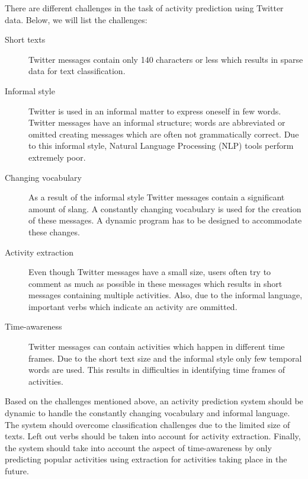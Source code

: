 There are different challenges in the task of activity prediction using Twitter data. Below, we will list the challenges:

\begin{description}
\item[Short texts] Twitter messages contain only 140 characters or less which results in sparse data for text classification.
\item[Informal style] Twitter is used in an informal matter to express oneself in few words. Twitter messages have an informal structure; words are abbreviated or omitted creating messages which are often not grammatically correct. Due to this informal style, Natural Language Processing (NLP) tools perform extremely poor.
\item[Changing vocabulary] As a result of the informal style Twitter messages contain a significant amount of slang. A constantly changing vocabulary is used for the creation of these messages. A dynamic program has to be designed to accommodate these changes.
\item[Activity extraction] Even though Twitter messages have a small size, users often try to comment as much as possible in these messages which results in short messages containing multiple activities. Also, due to the informal language, important verbs which indicate an activity are ommitted.
\item[Time-awareness] Twitter messages can contain activities which happen in different time frames. Due to the short text size and the informal style only few temporal words are used. This results in difficulties in identifying time frames of activities.
\end{description}

Based on the challenges mentioned above, an activity prediction system should be dynamic to handle the constantly changing vocabulary and informal language. The system should overcome classification challenges due to the limited size of texts. Left out verbs should be taken into account for activity extraction. Finally, the system should take into account the aspect of time-awareness by only predicting popular activities using extraction for activities taking place in the future.




